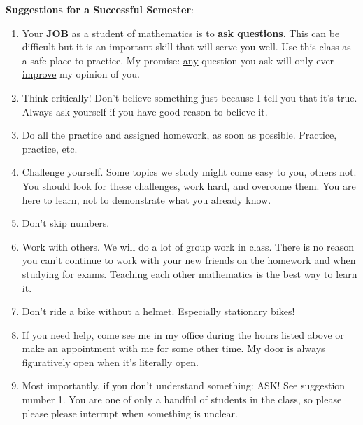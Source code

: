 \documentclass[12pt,letterpaper]{article}
\begin{document}
\noindent\textbf{Suggestions for a Successful Semester}:
\begin{enumerate}\itemsep1pt \parskip0pt 
\item Your \textbf{JOB} as a student of mathematics is to \textbf{ask questions}.  This can be difficult but it is an important skill that will serve you well.  Use this class as a safe place to practice.  My promise: \underline{any} question you ask will only ever \underline{improve} my opinion of you.
\item Think critically! Don't believe something just because I tell you that it's true. Always
ask yourself if you have good reason to believe it.
\item Do all the practice and assigned homework, as soon as possible.  Practice, practice, etc.
\item Challenge yourself.  Some topics we study might come easy to you, others not.  You should look for these challenges, work hard, and overcome them.  You are here to learn, not to demonstrate what you already know.
\setcounter{enumi}{5}
\item Don't skip numbers.
\item Work with others.  We will do a lot of group work in class.  There is no reason you can't continue to work with your new friends on the homework and when studying for exams.  Teaching each other mathematics is the best way to learn it.
\item Don't ride a bike without a helmet.  Especially stationary bikes!
\item If you need help, come see me in my office during the hours listed above or make an
appointment with me for some other time. My door is always figuratively open when it's literally open.
\item Most importantly, if you don't understand something: ASK!  See suggestion number 1.  You are one of only a handful of students in the class, so please please please interrupt when something is unclear.
\end{enumerate}
\end{document}
